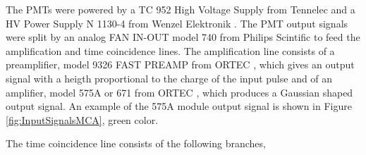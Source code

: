 The PMTs were powered by a TC 952 High Voltage Supply from Tennelec \cite{DataSheetHVSupplyTennelec} and a HV Power Supply N 1130-4 from Wenzel Elektronik \cite{DataSheetHVSupplyWenzel}. The PMT output signals were split by an analog FAN IN-OUT model 740 from Philips Scintific \cite{DataSheetFANINOUT} to feed the amplification and time coincidence lines. The amplification line consists of a preamplifier, model 9326 FAST PREAMP from ORTEC \cite{DataSheetPreAmp}, which gives an output signal with a heigth proportional to the charge of the input pulse and of an amplifier, model 575A or 671 from ORTEC \cite{DataSheet575Amp, DataSheet671Amp}, which produces a Gaussian shaped output signal. An example of the 575A module output signal is shown in Figure \ref{fig:InputSignalsMCA}, green color. 

The time coincidence line consists of the following branches,

